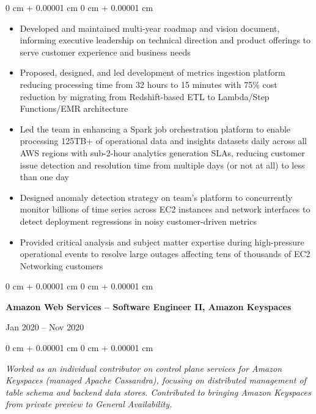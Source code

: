 \documentclass[10pt, letterpaper]{article}
\newenvironment{highlights}{
    \begin{itemize}[
        topsep=0.10 cm,
        parsep=0.10 cm,
        partopsep=0pt,
        itemsep=0pt,
        leftmargin=0 cm + 10pt
    ]
}{
    \end{itemize}
} %
\newenvironment{onecolentry}{
    \begin{adjustwidth}{
        0 cm + 0.00001 cm
    }{
        0 cm + 0.00001 cm
    }
}{
    \end{adjustwidth}
} %
\newenvironment{twocolentry}[2][]{
    \onecolentry
    \def\secondColumn{#2}
    \setcolumnwidth{\fill, 4.5 cm}
    \begin{paracol}{2}
}{
    \switchcolumn \raggedleft \secondColumn
    \end{paracol}
    \endonecolentry
} %
\begin{document}
        \vspace{0.05 cm}
        \begin{onecolentry}
            \begin{highlights}
                \item Developed and maintained multi-year roadmap and vision document, informing executive leadership on technical direction and product offerings to serve customer experience and business needs
                \item Proposed, designed, and led development of metrics ingestion platform reducing processing time from 32 hours to 15 minutes with 75\% cost reduction by migrating from Redshift-based ETL to Lambda/Step Functions/EMR architecture
                \item Led the team in enhancing a Spark job orchestration platform to enable processing 125TB+ of operational data and insights datasets daily across all AWS regions with sub-2-hour analytics generation SLAs, reducing customer issue detection and resolution time from multiple days (or not at all) to less than one day
                \item Designed anomaly detection strategy on team's platform to concurrently monitor billions of time series across EC2 instances and network interfaces to detect deployment regressions in noisy customer-driven metrics
                \item Provided critical analysis and subject matter expertise during high-pressure operational events to resolve large outages affecting tens of thousands of EC2 Networking customers
            \end{highlights}
        \end{onecolentry}

        \vspace{0.2 cm}

        \begin{twocolentry}{
            Jan 2020 – Nov 2020
        }
            \textbf{Amazon Web Services – Software Engineer II, Amazon Keyspaces}
        \end{twocolentry}

        \vspace{0.05 cm}
        \begin{onecolentry}
            \textit{Worked as an individual contributor on control plane services for Amazon Keyspaces (managed Apache Cassandra), focusing on distributed management of table schema and backend data stores. Contributed to bringing Amazon Keyspaces from private preview to General Availability.}
        \end{onecolentry}
\end{document}
